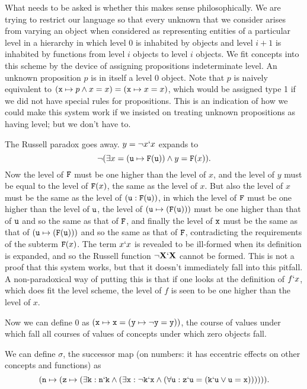 \documentclass[12pt]{article}
\begin{document}
What needs to be asked is whether this makes sense philosophically.  We are trying to restrict our language so that every unknown that we consider arises from varying an object when considered as representing
entities  of a particular level in a hierarchy in which level 0 is inhabited by objects and level $i+1$ is inhabited by functions from level $i$ objects to level $i$ objects.  We fit concepts into this scheme by the
device of assigning propositions indeterminate level.  An unknown proposition $p$ is in itself a level 0 object.  Note that $p$ is naively equivalent to $({\tt x} \mapsto p \wedge x=x)=({\tt x} \mapsto x=x)$, which would be assigned type 1 if we did not have special rules for propositions.  This is an indication of how we could make this system work if we insisted on treating unknown propositions as having level;  but we don't have to.

The Russell paradox goes away.  $y = \neg x`x$ expands to $$\neg(\exists x = ({\tt u} \mapsto {\tt F}({\tt u})) \wedge y = {\tt F}(x)).$$  Now the level of ${\tt F}$ must be one higher than the level of $x$,
and the level of $y$ must be equal to the level of ${\tt F}(x)$, the same as the level of $x$.  But also the level of $x$ must be the same as the level of $({\tt u}:{\tt F}({\tt u}))$, in which the level of ${\tt F}$ must be one higher than the level of ${\tt u}$, the level of $({\tt u} \mapsto ({\tt F}({\tt u})))$ must be one higher than that of ${\tt u}$ and so the same as that of ${\tt F}$, and finally the level of ${\tt x}$ must be
the same as that of $({\tt u} \mapsto ({\tt F}({\tt u})))$ and so the same as that of ${\tt F}$, contradicting the requirements of the subterm ${\tt F}(x)$.  The term $x`x$ is revealed to be ill-formed when its definition is expanded, and so the Russell function $\neg {\bf X}`{\bf X}$ cannot be formed.  This is not a proof that this system works, but that it doesn't immediately fall into this pitfall.  A non-paradoxical way of putting this
is that if one looks at the definition of $f`x$, which does fit the level scheme, the level of $f$ is seen to be one higher than the level of $x$.

Now we can define 0 as $({\tt x} \mapsto {\tt x} = ({\tt y} \mapsto \neg {\tt y} = {\tt y}))$, the course of values under which fall all courses of values of concepts under which zero objects fall.

We can define $\sigma$, the successor map (on numbers:  it has eccentric effects on other concepts and functions) as $$({\tt n} \mapsto ({\tt z} \mapsto(\exists{\tt k }:{\tt n}`{\tt k} \wedge (\exists {\tt x}:\neg {\tt k}`{\tt x} \wedge (\forall {\tt u}: {\tt z}`{\tt u} = ({\tt  k}`{\tt u} \vee {\tt u} = {\tt x})))))).$$
\end{document}
